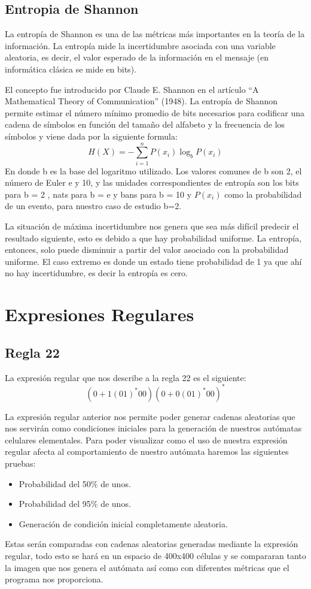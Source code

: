 \documentclass[11pt]{article}
\begin{document}
		\subsection{Entropia de Shannon}
		La entropía de Shannon es una de las métricas más importantes en la teoría de la información. La entropía mide la incertidumbre asociada con una variable aleatoria, es decir, el valor esperado de la información en el mensaje (en informática clásica se mide en bits).\par
El concepto fue introducido por Claude E. Shannon en el artículo ``A Mathematical Theory of Communication'' (1948). La entropía de Shannon permite estimar el número mínimo promedio de bits necesarios para codificar una cadena de símbolos en función del tamaño del alfabeto y la frecuencia de los símbolos y viene dada por la siguiente formula:
  \[ H(X) = -\sum_{i=1}^{n} P(x_i)\log_bP(x_i)\]
  En donde b es la base del logaritmo utilizado. Los valores comunes de b son 2, el número de Euler e y 10, y las unidades correspondientes de entropía son los bits para b = 2 , nats para b = e y bans para b = 10 y $P(x_i)$ como la probabilidad de un evento, para nuestro caso de estudio b=2.\par
La situación de máxima incertidumbre nos genera que sea más difícil predecir el resultado siguiente, esto es debido a que hay probabilidad uniforme. La entropía, entonces, solo puede disminuir a partir del valor asociado con la probabilidad uniforme. El caso extremo es donde un estado tiene probabilidad de 1 ya que ahí no hay incertidumbre, es decir la entropía es cero.
	\section{Expresiones Regulares}
		\subsection{Regla 22}
		La expresión regular que nos describe a la regla 22 es el siguiente:\[(0+1(01)^\ast00)(0+0(01)^\ast00)^\ast\]\par
		La expresión regular anterior nos permite poder generar cadenas aleatorias que nos servirán como condiciones iniciales para la generación de nuestros autómatas celulares elementales. Para poder visualizar como el uso de nuestra expresión regular afecta al comportamiento de nuestro autómata haremos las siguientes pruebas:
		\begin{itemize}
    		 \item Probabilidad del 50\% de unos. 
		    \item Probabilidad del 95\% de unos.
		    \item Generación de condición inicial completamente aleatoria.
		\end{itemize}\par
		Estas serán comparadas con cadenas aleatorias generadas mediante la expresión regular, todo esto se hará en un espacio de 400x400 células y se compararan tanto la imagen que nos genera el autómata así como con diferentes métricas que el programa nos proporciona.
\end{document}
